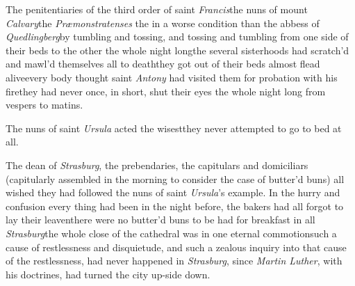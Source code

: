 \documentclass{article}
\begin{document}
The penitentiaries of the third order of saint \textit{Francis}\tsh the nuns of
mount \textit{Calvary}\tsk the \textit{Præmonstratenses}\tsh
the\break
{}
\vskip -4pt
\vskip -4pt
\eject
\noindent
in a worse condition than the abbess of
\textit{Quedlingberg}\tsk by tumbling and tossing, and
tossing and tumbling from one side of their beds to the
other the whole night long\tsk the several sisterhoods had
scratch’d and mawl’d themselves all to death\tsk they got
out of their beds almost flead alive\tsk every body thought
saint \textit{Antony} had visited them for probation with
his fire\tsh they had never once, in short, shut their eyes
the whole night long from vespers to matins.

The nuns of saint \textit{Ursula} acted the wisest\tsk they
never attempted to go to bed at all.

The dean of \textit{Strasburg}, the prebenda\-ries, the capitulars
and domiciliars (capitularly assembled in the morning to consider
the case of butter’d buns) all wished they had followed the
nuns of saint \textit{Ursula}’s example.\tsh
In the hurry and confusion every thing had been in the night
before, the bakers had all forgot to lay their leaven\tsk there
were no butter’d buns to be had for breakfast in all
\textit{Strasburg}\tsk the whole close of the cathedral was in one
eternal commotion\tsk such a cause of restlessness and
disquietude, and such a zealous inquiry into that cause of the
restlessness, had never hap\-pened in \textit{Strasburg}, since
\textit{Martin Lut\-her}, with his doctrines, had turned the city
up-side down.
\end{document}
